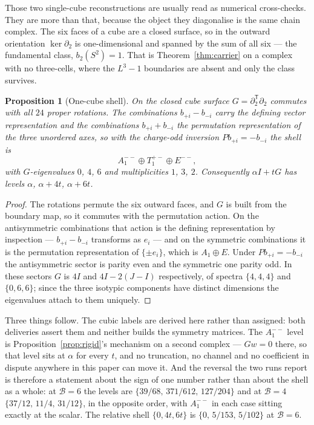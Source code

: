 \documentclass[11pt]{article}
\theoremstyle{plain}
\newtheorem{proposition}[theorem]{Proposition}
\theoremstyle{definition}
\theoremstyle{remark}
\newcommand{\chk}[1]{}
\begin{document}
Those two single-cube reconstructions are usually read as numerical
cross-checks. They are more than that, because the object they diagonalise is
the same chain complex. The six faces of a cube are a closed surface, so in the
outward orientation $\ker\partial_2$ is one-dimensional and spanned by the sum
of all six --- the fundamental class, $b_2(S^2)=1$. That is
Theorem~\ref{thm:carrier} on a complex with no three-cells, where the $L^3-1$
boundaries are absent and only the class survives.

\begin{proposition}[One-cube shell]\label{prop:cube}
On the closed cube surface $G=\partial_2^{\mathsf T}\partial_2$ commutes with
all $24$ proper rotations. The combinations $b_{+i}-b_{-i}$ carry the defining
vector representation and the combinations $b_{+i}+b_{-i}$ the permutation
representation of the three unordered axes, so with the charge-odd inversion
$Pb_{+i}=-b_{-i}$ the shell is
\[
  A_1^{--}\oplus T_1^{+-}\oplus E^{--},
\]
with $G$-eigenvalues $0$, $4$, $6$ and multiplicities $1$, $3$, $2$.
Consequently $\alpha I+tG$ has levels $\alpha$, $\alpha+4t$, $\alpha+6t$.
\end{proposition}

\begin{proof}
The rotations permute the six outward faces, and $G$ is built from the boundary
map, so it commutes with the permutation action. On the antisymmetric
combinations that action is the defining representation by inspection --- $b_{+i}-b_{-i}$
transforms as $e_i$ --- and on the symmetric combinations it is the
permutation representation of $\{\pm e_i\}$, which is $A_1\oplus E$. Under
$Pb_{+i}=-b_{-i}$ the antisymmetric sector is parity even and the symmetric one
parity odd. In these sectors $G$ is $4I$ and $4I-2(J-I)$ respectively, of
spectra $\{4,4,4\}$ and $\{0,6,6\}$; since the three isotypic components have
distinct dimensions the eigenvalues attach to them uniquely.
\end{proof}
\chk{the one-cube shell is A1 + T1 + E, and its flat level is the S\^{}2 fundamental class}

Three things follow. The cubic labels are derived here rather than assigned:
both deliveries assert them and neither builds the symmetry matrices. The
$A_1^{--}$ level is Proposition~\ref{prop:rigid}'s mechanism on a second
complex --- $Gw=0$ there, so that level sits at $\alpha$ for every $t$, and no truncation, no
channel and no coefficient in dispute anywhere in this paper can move it. And
the reversal the two runs report is therefore a statement about the sign of one
number rather than about the shell as a whole: at $\mathcal B=6$ the levels are
$\{39/68,\,371/612,\,127/204\}$ and at $\mathcal B=4$ $\{37/12,\,11/4,\,31/12\}$, in
the opposite order, with $A_1^{--}$ in each case sitting exactly at the scalar.
The relative shell $\{0,4t,6t\}$ is $\{0,\,5/153,\,5/102\}$ at $\mathcal B=6$.
\end{document}
